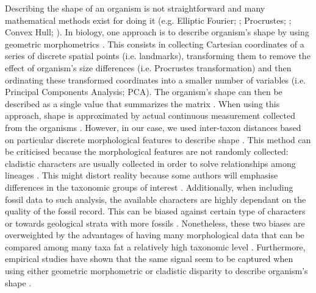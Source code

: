 Describing the shape of an organism is not straightforward and many mathematical methods exist for doing it (e.g. Elliptic Fourier; \citealt{Fourier1982}; Procrustes; \citealt{JamesRohlf1993129}; Convex Hull; \citealt{ANDREW1979216}).
In biology, one approach is to describe organism's shape by using geometric morphometrics \citep{zelditch2012geometric}.
This consists in collecting Cartesian coordinates of a series of discrete spatial points (i.e. landmarks), transforming them to remove the effect of organism's size differences (i.e. Procrustes transformation) and then ordinating these transformed coordinates into a smaller number of variables (i.e. Principal Components Analysis; PCA).
The organism's shape can then be described as a single value that summarizes the matrix \citep[e.g. the sum of the ranges of each PCA axis;][]{zelditch2012geometric}. 
When using this approach, shape is approximated by actual continuous measurement collected from the organisms \citep[e.g.][]{friedmanexplosive2010,hopkinsdecoupling2013,finlay2015morphological}.  %
However, in our case, we used inter-taxon distances based on particular discrete morphological features to describe shape \citep[i.e. the cladistic disparity method; e.g.][]{foote1997evolution,Wills2001,Wesley-Hunt2005}.
This method can be criticised because the morphological features are not randomly collected: cladistic characters are usually collected in order to solve relationships among lineages \citep{O'Leary08022013}.
This might distort reality because some authors will emphasise differences in the taxonomic groups of interest \citep{Hopkins24032015}.
Additionally, when including fossil data to such analysis, the available characters are highly dependant on the quality of the fossil record.
This can be biased against certain type of characters \citep[e.g. soft tissue ones;][]{sansomfossilization2013} or towards geological strata with more fossils \citep[e.g. \textit{Lagerst\"{a}tten};][]{Butler2012}.
Nonetheless, these two biases are overweighted by the advantages of having many morphological data \citep[some morphological matrices have more than 1000 characters; e.g.][]{O'Leary08022013,ni2013oldest} that can be compared among many taxa fat a relatively high taxonomic level \citep[e.g. among all mammals;][]{O'Leary08022013,Slater2012MEE,beckancient2014}.
Furthermore, empirical studies have shown that the same signal seem to be captured when using either geometric morphometric or cladistic disparity to describe organism's shape \citep{foth2012different,hetherington2015cladistic}. 

